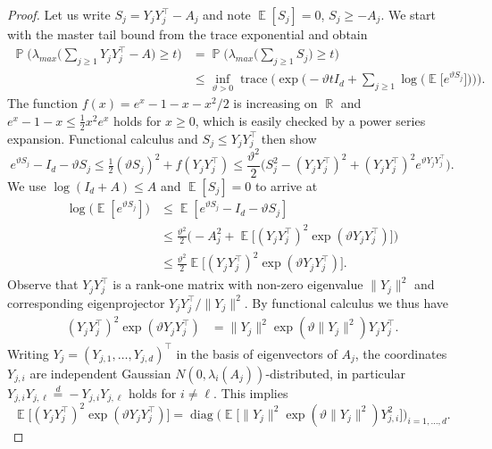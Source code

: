 \documentclass[preprint,aos]{imsart}
\numberwithin{equation}{section}
\theoremstyle{remark}
\DeclareMathOperator{\E}{{\mathbb E}}
\DeclareMathOperator{\R}{{\mathbb R}}
\DeclareMathOperator{\PP}{{\mathbb P}}
\DeclareMathOperator{\trace}{trace}
\DeclareMathOperator{\diag}{diag} \DeclareMathOperator{\KL}{KL}
\renewcommand{\theta}{\vartheta}
\providecommand{\norm}[1]{\lVert #1 \rVert}
\renewcommand{\le}{\leqslant}
\renewcommand{\ge}{\geqslant}
\begin{document}
\begin{appendix}
\begin{proof}
Let us write $S_j=Y_jY_j^\top-A_j$ and note $\E[S_j]=0$, $S_j\ge -A_j$. We start with the master tail bound from the trace exponential \citep[Theorem 3.6]{tropp2012} and obtain
\begin{align*}
\PP\Big(\lambda_{max}\Big(\sum_{j\ge 1} Y_jY_j^\top-A\Big)\ge t\Big) &= \PP\Big(\lambda_{max}\Big(\sum_{j\ge 1} S_j\Big)\ge t\Big)\\
&\le \inf_{\theta>0} \trace\Big(\exp\Big(-\theta t I_d+\sum_{j\ge 1} \log\big(\E\big[e^{\theta S_j}\big]\big)\Big)\Big).
\end{align*}
The function $f(x)=e^x-1-x-x^2/2$ is increasing on $\R$ and $e^x-1-x\le \frac12 x^2e^x$ holds for $x\ge 0$, which is easily checked by a power series expansion. Functional calculus and $S_j\le Y_jY_j^\top$ then show
 \[ e^{\theta S_j}-I_d-\theta S_j\le \tfrac12(\theta S_j)^2+f(Y_jY_j^\top)\le \frac{\theta^2}2\Big(S_j^2-(Y_jY_j^\top)^2+(Y_jY_j^\top)^2e^{\theta Y_jY_j^\top}\Big).
\]
We use $\log(I_d+A)\le A$ and $\E[S_j]=0$ to arrive at
\begin{align*}
\log\big(\E[e^{\theta S_j}]\big)&\le \E[e^{\theta S_j}-I_d-\theta S_j]\\
&\le \frac{\theta^2}{2}\Big(-A_j^2+\E\big[(Y_jY_j^\top)^2\exp(\theta Y_jY_j^\top)\big]\Big)\\
&\le \frac{\theta^2}{2}\E\Big[(Y_jY_j^\top)^2\exp(\theta Y_jY_j^\top)\Big].
\end{align*}
Observe that $Y_jY_j^\top$ is a rank-one matrix with non-zero eigenvalue $\norm{Y_j}^2$ and corresponding eigenprojector $Y_jY_j^\top/\norm{Y_j}^2$. By functional calculus we thus have
\begin{align*}
(Y_jY_j^\top)^2\exp(\theta Y_jY_j^\top) &= \norm{Y_j}^2\exp(\theta \norm{Y_j}^2)Y_jY_j^\top.
\end{align*}
Writing $Y_j=(Y_{j,1},\ldots,Y_{j,d})^\top$ in the basis of eigenvectors of $A_j$, the coordinates $Y_{j,i}$ are independent Gaussian $N(0,\lambda_i(A_j))$-distributed, in particular $Y_{j,i}Y_{j,\ell}\stackrel{d}{=}-Y_{j,i}Y_{j,\ell}$ holds for $i\not=\ell$. This implies
\[  \E\big[(Y_jY_j^\top)^2\exp(\theta Y_jY_j^\top)\big]=\diag\Big(\E\big[\norm{Y_j}^2\exp(\theta \norm{Y_j}^2)Y_{j,i}^2\big]\Big)_{i=1,\ldots,d}.
\]
\end{proof}
\end{appendix}
\end{document}
